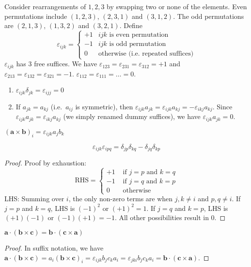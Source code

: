\documentclass[a4paper]{article}
\begin{document}
\begin{defi}
  Consider rearrangements of $1, 2, 3$ by swapping two or none of the elements. Even permutations include $(1, 2, 3)$, $(2, 3, 1)$ and $(3, 1, 2)$. The odd permutations are $(2, 1, 3)$, $(1, 3, 2)$ and $(3, 2, 1)$. Define
\begin{equation}
    \varepsilon_{ijk} =
    \begin{cases}
      +1 & ijk \text{ is even permutation}\\
      -1 & ijk\text{ is odd permutation}\\
      0 & \text{otherwise (i.e.\ repeated suffices)}
    \end{cases}\tag{1.5}
\end{equation}
  $\varepsilon_{ijk}$ has 3 free suffices. We have $\varepsilon_{123} = \varepsilon_{231} = \varepsilon_{312} = +1$ and $\varepsilon_{213} = \varepsilon_{132} = \varepsilon_{321} = -1$. $\varepsilon_{112} = \varepsilon_{111} = \dots = 0$.
\end{defi}
\begin{enumerate}
  \item $\varepsilon_{ijk}\delta_{jk} = \varepsilon_{ijj} = 0$
  \item If $a_{jk} = a_{kj}$ (i.e.\ $a_{ij}$ is symmetric), then $\varepsilon_{ijk}a_{jk} = \varepsilon_{ijk}a_{kj} = -\varepsilon_{ikj}a_{kj}$. Since $\varepsilon_{ijk}a_{jk} = \varepsilon_{ikj}a_{kj}$ (we simply renamed dummy suffices), we have $\varepsilon_{ijk}a_{jk} = 0$.
\end{enumerate}

\begin{prop}
  $(\mathbf{a} \times \mathbf{b})_i = \varepsilon_{ijk}a_jb_k$
\end{prop}
\begin{thm}
\begin{equation}
\varepsilon_{ijk}\varepsilon_{ipq} = \delta_{jp}\delta_{kq} - \delta_{jq}\delta_{kp}\tag{1.6}
\end{equation}
\end{thm}
\begin{proof}
 Proof by exhaustion:
$$\text{RHS} = \begin{cases}
      +1 &\text{ if } j = p \text{ and } k = q\\
      -1 &\text{ if } j = q \text{ and } k = p\\
      0 &\text{ otherwise}
    \end{cases}$$
  LHS: Summing over $i$, the only non-zero terms are when $j, k\not=i$ and $p, q\not=i$. If $j = p$ and $k = q$, LHS is $(-1)^2$ or $(+1)^2 = 1$. If $j = q$ and $k = p$, LHS is $(+1)(-1)$ or $(-1)(+1) = -1$. All other possibilities result in 0.
\end{proof}
\begin{prop}
$\mathbf{a\cdot (b\times c) = b\cdot(c\times a)}$
\end{prop}
\begin{proof}
In suffix notation, we have
  $\mathbf{a\cdot (b\times c)} = a_i\mathbf{(b\times c)}_i = \varepsilon_{ijk}b_jc_ka_i = \varepsilon_{jki}b_jc_ka_i = \mathbf{b\cdot (c\times a)}$.
\end{proof}
  
\end{document}

